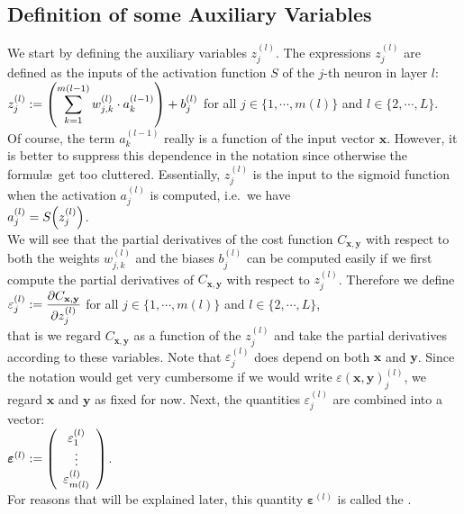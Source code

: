 \subsection{Definition of some Auxiliary Variables}
We start by defining the auxiliary variables $z_j^{(l)}$.
 The expressions $z_j^{(l)}$  are defined as the inputs of the activation function $S$ of the $j$-th neuron in
 layer $l$:
\\[0.2cm]
\hspace*{1.3cm}
$\displaystyle z_j^{(l)} := \left(\sum\limits_{k=1}^{m(l-1)}  w_{j,k}^{(l)} \cdot a_k^{(l-1)}\right) + b_j^{(l)}$
\quad for all  $j \in \{1, \cdots, m(l)\}$ and $l \in \{2,\cdots,L\}$.
\\[0.2cm]
Of course, the term  $a_k^{(l-1)}$ really is a function of the input vector $\mathbf{x}$.  However, it is better to suppress
this dependence in the notation since otherwise the formul\ae\ get too cluttered.
Essentially, $z_j^{(l)}$ is the input to the sigmoid function when the activation $a_j^{(l)}$ is computed,
i.e.~we have
\\[0.2cm]
\hspace*{1.3cm}
$a_j^{(l)} = S\Bigl(z_j^{(l)}\Bigr)$.
\\[0.2cm]
We will see that the partial derivatives of the cost function $C_{\mathbf{x}, \mathbf{y}}$ with respect to both the weights
$w_{j,k}^{(l)}$ and the biases $b_j^{(l)}$ can be computed easily if we first compute the partial derivatives
of $C_{\mathbf{x}, \mathbf{y}}$ with respect to $z_j^{(l)}$.  Therefore we define
\\[0.2cm]
\hspace*{1.3cm}
$\displaystyle\varepsilon_j^{(l)} := \frac{\partial C_{\mathbf{x}, \mathbf{y}}}{\partial z_j^{(l)}}$ \quad for all $j \in \{1, \cdots, m(l)\}$ and $l \in \{2,\cdots, L\}$,
\\[0.2cm]
that is we regard $C_{\mathbf{x}, \mathbf{y}}$ as a function of the $z_j^{(l)}$ and take the partial
derivatives according to these variables.  
Note that $\varepsilon_j^{(l)}$ does depend on both $\mathbf{x}$ and $\mathbf{y}$.  Since the notation would
get very cumbersome if we would write $\varepsilon(\mathbf{x}, \mathbf{y})_j^{(l)}$, we regard $\mathbf{x}$ and
$\mathbf{y}$ as fixed for now.  Next, the quantities $\varepsilon_j^{(l)}$ are combined into a vector:
\\[0.2cm]
\hspace*{1.3cm}
$\boldsymbol{\varepsilon}^{(l)} := \left(
  \begin{array}[c]{c}
    \varepsilon_1^{(l)}      \\
    \vdots             \\
    \varepsilon_{m(l)}^{(l)}  
  \end{array}
  \right)
$.
\\[0.2cm]
For reasons that will be explained later, this quantity $\boldsymbol{\varepsilon}^{(l)}$ is called the .
\pagebreak

